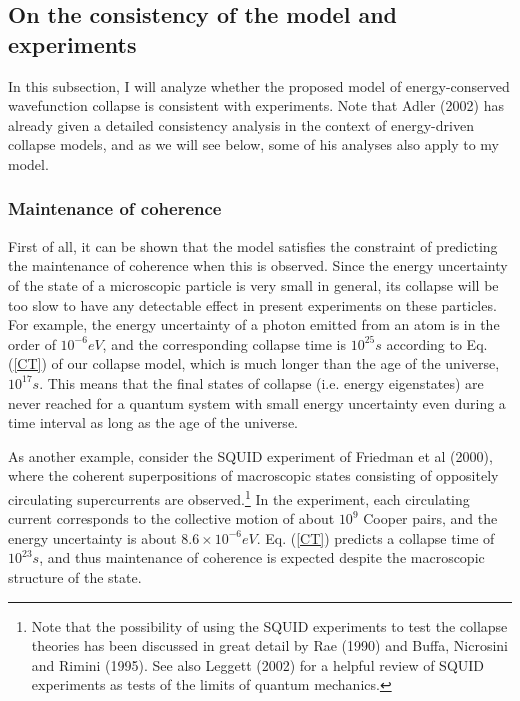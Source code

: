 \subsection{On the consistency of the model and experiments}

 
In this subsection, I will analyze whether the proposed model of energy-conserved wavefunction collapse is consistent with experiments. Note that Adler (2002) has already given a detailed consistency analysis in the context of energy-driven collapse models, and as we will see below, some of his analyses also apply to my model.

\subsubsection{Maintenance of coherence}

First of all, it can be shown that the model satisfies the constraint of predicting the maintenance of coherence when this is observed. Since the energy uncertainty of the state of a microscopic particle is very small in general, its collapse will be too slow to have any detectable effect in present experiments on these particles. For example, the energy uncertainty of a photon emitted from an atom is in the order of $10^{-6}eV$, and the corresponding collapse time is $10^{25}s$ according to Eq. (\ref{CT}) of our collapse model, which is much longer than the age of the universe, $10^{17}s$. This means that the final states of collapse (i.e. energy eigenstates) are never reached for a quantum system with small energy uncertainty even during a time interval as long as the age of the universe. 

As another example, consider the SQUID experiment of Friedman et al (2000), where the coherent superpositions of macroscopic states consisting of oppositely circulating supercurrents are observed.\footnote{Note that the possibility of using the SQUID experiments to test the collapse theories has been discussed in great detail by Rae (1990) and Buffa, Nicrosini and Rimini (1995). See also Leggett (2002) for a helpful review of SQUID experiments as tests of the limits of quantum mechanics.} In the experiment, each circulating current corresponds to the collective motion of about $10^9$ Cooper pairs, and the energy uncertainty is about $8.6 \times 10^{-6}eV$. Eq. (\ref{CT})  predicts a collapse time of $10^{23}s$, and thus maintenance of coherence is expected despite the macroscopic structure of the state.

